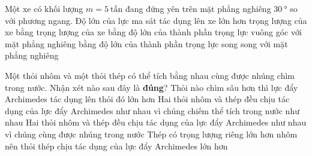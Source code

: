 \begin{ex}
	Một xe có khối lượng $m=\SI{5}{\text{tấn}}$ đang đứng yên trên mặt phẳng nghiêng $\SI{30}{\degree}$ so với phương ngang. Độ lớn của lực ma sát tác dụng lên xe
	\choice
	{lớn hơn trọng lượng của xe}
	{bằng trọng lượng của xe}
	{bằng độ lớn của thành phần trọng lực vuông góc với mặt phẳng nghiêng}
	{\True bằng độ lớn của thành phần trọng lực song song với mặt phẳng nghiêng}
	\loigiai{}
\end{ex}
\begin{ex}
	Một thỏi nhôm và một thỏi thép có thể tích bằng nhau cùng được nhúng chìm trong nước. Nhận xét nào sau đây là \textbf{đúng}?	
	\choice
	{Thỏi nào chìm sâu hơn thì lực đẩy Archimedes tác dụng lên thỏi đó lớn hơn}
	{\True Hai thỏi nhôm và thép đều chịu tác dụng của lực đẩy Archimedes như nhau vì chúng chiếm thể tích trong nước như nhau}
	{Hai thỏi nhôm và thép đều chịu tác dụng của lực đẩy Archimedes như nhau vì chúng cùng được nhúng trong nước}
	{Thép có trọng lượng riêng lớn hơn nhôm nên thỏi thép chịu tác dụng của lực đẩy Archimedes lớn hơn}
	\loigiai{}
\end{ex}

